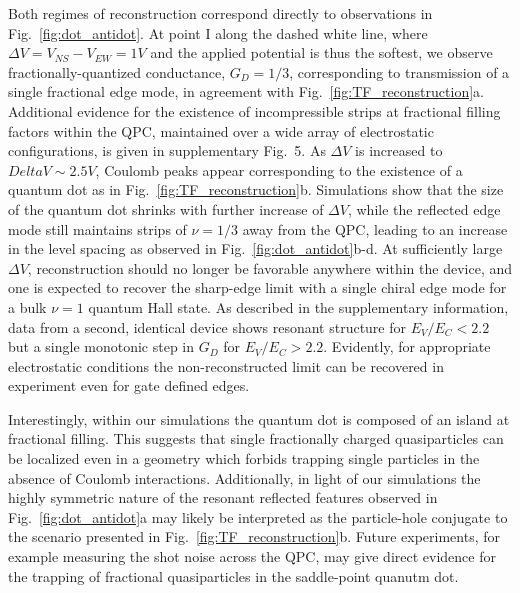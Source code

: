 \documentclass[reprint,prl,aps,superscriptaddress]{revtex4-1}
\begin{document}
Both regimes of reconstruction correspond directly to observations in Fig.~\ref{fig:dot_antidot}.  At point I along the dashed white line, where $\Delta V = V_{NS} - V_{EW} = 1 V$ and the applied potential is thus the softest, we observe fractionally-quantized conductance, $G_D = 1/3$, corresponding to transmission of a single fractional edge mode, in agreement with Fig.~\ref{fig:TF_reconstruction}a. Additional evidence for the existence of incompressible strips at fractional filling factors within the QPC, maintained over a wide array of electrostatic configurations, is given in supplementary Fig.~5.  As $\Delta V$ is increased to $Delta V \sim 2.5V$, Coulomb peaks appear corresponding to the existence of a quantum dot as in Fig.~\ref{fig:TF_reconstruction}b. Simulations show that the size of the quantum dot shrinks with further increase of $\Delta V$, while the reflected edge mode still maintains strips of $\nu = 1/3$ away from the QPC, leading to an increase in the level spacing as observed in Fig.~\ref{fig:dot_antidot}b-d.  At sufficiently large $\Delta V$, reconstruction should no longer be favorable anywhere within the device, and one is expected to recover the sharp-edge limit with a single chiral edge mode for a bulk $\nu = 1$ quantum Hall state. As described in the supplementary information, data from a second, identical device shows resonant structure for $E_V / E_C < 2.2$ but a single monotonic step in $G_D$ for $E_V / E_C > 2.2$. Evidently, for appropriate electrostatic conditions the non-reconstructed limit can be recovered in experiment even for gate defined edges.

Interestingly, within our simulations the quantum dot is composed of an island at fractional filling.  This suggests that single fractionally charged quasiparticles can be localized even in a geometry which forbids trapping single particles in the absence of Coulomb interactions.  Additionally, in light of our simulations the highly symmetric nature of the resonant reflected features observed in Fig.~\ref{fig:dot_antidot}a may likely be interpreted as the particle-hole conjugate to the scenario presented in Fig.~\ref{fig:TF_reconstruction}b. Future experiments, for example measuring the shot noise across the QPC, may give direct evidence for the trapping of fractional quasiparticles in the saddle-point quanutm dot.  
\end{document}
